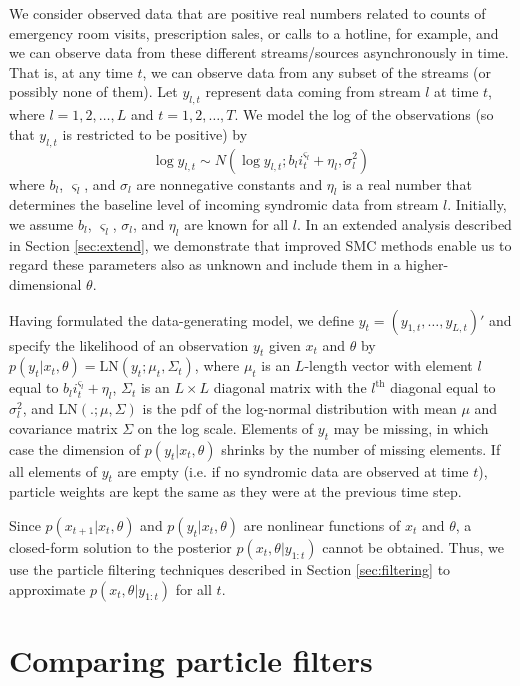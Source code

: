 \documentclass{elsarticle}
\begin{document}
We consider observed data that are positive real numbers related to counts of emergency room visits, prescription sales, or calls to a hotline, for example, and we can observe data from these different streams/sources asynchronously in time. That is, at any time $t$, we can observe data from any subset of the streams (or possibly none of them). Let $y_{l,t}$ represent data coming from stream $l$ at time $t$, where $l = 1,2,\ldots,L$ and $t = 1,2,\ldots,T$. We model the log of the observations (so that $y_{l,t}$ is restricted to be positive) by
\begin{equation}
\log y_{l,t} \sim N\left(\log y_{l,t};b_li_t^{\varsigma_l} + \eta_l,\sigma_l^2\right) \label{eqn:obs}
\end{equation}
where $b_l$, $\varsigma_l$, and $\sigma_l$ are nonnegative constants \citep{skvortsov2012monitoring} and $\eta_l$ is a real number that determines the baseline level of incoming syndromic data from stream $l$. Initially, we assume $b_l$, $\varsigma_l$, $\sigma_l$, and $\eta_l$ are known for all $l$. In an extended analysis described in Section \ref{sec:extend}, we demonstrate that improved SMC methods enable us to regard these parameters also as unknown and include them in a higher-dimensional $\theta$.

Having formulated the data-generating model, we define $y_t = (y_{1,t},\ldots,y_{L,t})'$ and specify the likelihood of an observation $y_t$ given $x_t$ and $\theta$ by $p(y_t|x_t,\theta) = \mbox{LN}(y_t;\mu_t,\Sigma_t)$, where $\mu_t$ is an $L$-length vector with element $l$ equal to $b_li_t^{\varsigma_l} + \eta_l$, $\Sigma_t$ is an $L \times L$ diagonal matrix with the $l^{\mbox{th}}$ diagonal equal to $\sigma_l^2$, and $\mbox{LN}(.;\mu,\Sigma)$ is the pdf of the log-normal distribution with mean $\mu$ and covariance matrix $\Sigma$ on the log scale. Elements of $y_t$ may be missing, in which case the dimension of $p(y_t|x_t,\theta)$ shrinks by the number of missing elements. If all elements of $y_t$ are empty (i.e. if no syndromic data are observed at time $t$), particle weights are kept the same as they were at the previous time step.

Since $p(x_{t+1}|x_t,\theta)$ and $p(y_t|x_t,\theta)$ are nonlinear functions of $x_t$ and $\theta$, a closed-form solution to the posterior $p(x_t,\theta|y_{1:t})$ cannot be obtained. Thus, we use the particle filtering techniques described in Section \ref{sec:filtering} to approximate $p(x_t,\theta|y_{1:t})$ for all $t$.

\section{Comparing particle filters} \label{sec:results}
\end{document}
